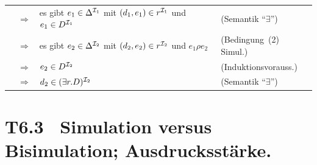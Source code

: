 \documentclass[fontsize=11pt, twoside=false, numbers=autoenddot]{scrbook}
\begin{document}
\begin{beweis}
\begin{description}
\begin{description}
          \begin{tabular}{@{}l@{}l@{~\,}l@{~~}l@{}}
            & $\Rightarrow$ & es gibt $e_1 \in \Delta^{\mathcal{I}_1}$ mit $(d_1,e_1) \in r^{\mathcal{I}_1}$ und $e_1 \in D^{\mathcal{I}_1}$ & (Semantik "`$\exists$"') \\
            & $\Rightarrow$ & es gibt $e_2 \in \Delta^{\mathcal{I}_2}$ mit $(d_2,e_2) \in r^{\mathcal{I}_2}$ und $e_1\rho e_2$ & (Bedingung~(2) Simul.) \\
            & $\Rightarrow$ & $e_2 \in D^{\mathcal{I}_2}$ & (Induktionsvorauss.) \\
            & $\Rightarrow$ & $d_2 \in (\exists r.D)^{\mathcal{I}_2}$ & (Semantik "`$\exists$"')
          \end{tabular}
          \par\vspace*{-1.1\baselineskip}
          \qedhere
      \end{description}
  \end{description}
\end{beweis}

\section*{T6.3~ Simulation versus Bisimulation; Ausdrucksstärke.}

\newenvironment{tikzpicturetwointerp}{%
  \begin{tikzpicture}[%
    >=Latex,baseline=11pt,
    every state/.style={draw=black,thin,fill=black!10,inner sep=.6mm,minimum size=6mm},
    every edge/.style={draw=black,thin}
  ]
    \node[state] (leps)                                   {$d_1$};
    \node[state] (l0)   [below      =8mm         of leps] {};
    
    \node[state] (reps) [right=20mm of leps]              {$d_2$};
    \node[state] (r0)   [below left =9.5mm and 4mm of reps] {};
    \node[state] (r1)   [below right=9.5mm and 4mm of reps] {};
    
    \node [left=0mm of l0]  {$A$};
    
    \node [right=0mm of r0]   {$A$};
  
    \node [above left=0mm and 1mm of leps] {$\Imc_1$};
    \node [above left=0mm and 1mm of reps] {$\Imc_2$};
  
    \path[->]
      (leps) edge node[pos=.6, left]       {$r$} (l0)
  
      (reps) edge node[pos=.4,left =1mm] {$r$} (r0)
      (reps) edge node[pos=.4,right=1mm] {$r$} (r1)
    ;
}{%
  \end{tikzpicture}
}%
\end{document}
